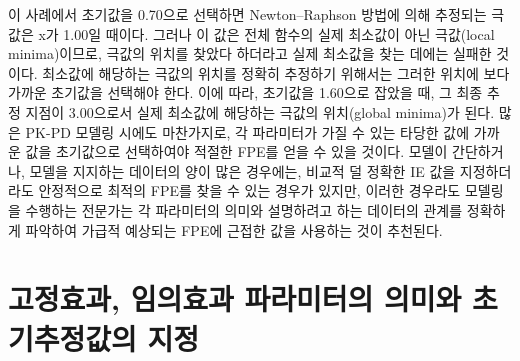 \documentclass[
  10pt,
]{krantz}
\begin{document}
이 사례에서 초기값을 0.70으로 선택하면 Newton--Raphson 방법에 의해 추정되는 극값은 x가 1.00일 때이다. 그러나 이 값은 전체 함수의 실제 최소값이 아닌 극값(local minima)이므로, 극값의 위치를 찾았다 하더라고 실제 최소값을 찾는 데에는 실패한 것이다. 최소값에 해당하는 극값의 위치를 정확히 추정하기 위해서는 그러한 위치에 보다 가까운 초기값을 선택해야 한다. 이에 따라, 초기값을 1.60으로 잡았을 때, 그 최종 추정 지점이 3.00으로서 실제 최소값에 해당하는 극값의 위치(global minima)가 된다. 많은 PK-PD 모델링 시에도 마찬가지로, 각 파라미터가 가질 수 있는 타당한 값에 가까운 값을 초기값으로 선택하여야 적절한 FPE를 얻을 수 있을 것이다. 모델이 간단하거나, 모델을 지지하는 데이터의 양이 많은 경우에는, 비교적 덜 정확한 IE 값을 지정하더라도 안정적으로 최적의 FPE를 찾을 수 있는 경우가 있지만, 이러한 경우라도 모델링을 수행하는 전문가는 각 파라미터의 의미와 설명하려고 하는 데이터의 관계를 정확하게 파악하여 가급적 예상되는 FPE에 근접한 값을 사용하는 것이 추천된다.

\hypertarget{uxace0uxc815uxd6a8uxacfc-uxc784uxc758uxd6a8uxacfc-uxd30cuxb77cuxbbf8uxd130uxc758-uxc758uxbbf8uxc640-uxcd08uxae30uxcd94uxc815uxac12uxc758-uxc9c0uxc815}{%
\section{고정효과, 임의효과 파라미터의 의미와 초기추정값의 지정}\label{uxace0uxc815uxd6a8uxacfc-uxc784uxc758uxd6a8uxacfc-uxd30cuxb77cuxbbf8uxd130uxc758-uxc758uxbbf8uxc640-uxcd08uxae30uxcd94uxc815uxac12uxc758-uxc9c0uxc815}}
\end{document}
